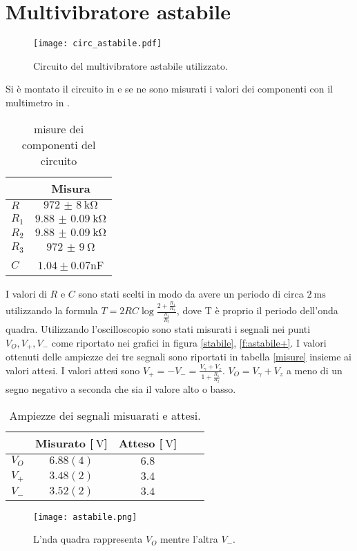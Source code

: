 \section{Multivibratore astabile}
\begin{figure}[h]
	\centering
	\texttt{[image: circ\_astabile.pdf]}
	\caption{Circuito del multivibratore astabile utilizzato.}
	\label{f:multi_vibr}
\end{figure}
Si è montato il circuito in  e se ne sono misurati i valori dei componenti con il multimetro in .
\begin{table}
	\centering
	\begin{tabular}{lc} 
 	&Misura\\ \hline
 	$R$	&$\SI{972(8)}{\kohm}$\\
	 $R_1$	&$\SI{9.88(9)}{\kohm}$\\
	 $R_2$	&$\SI{9.88(9)}{\kohm}$\\
	 $R_3$	&$\SI{972(9)}{\ohm}$\\
	 $C$	&$1.04 \pm 0.07$nF
	\end{tabular}
	\caption{misure dei componenti del circuito}
	\label{misure_componenti}
\end{table}
I valori di $R$ e $C$ sono stati scelti in modo da avere un periodo di circa $\SI{2}{\ms}$ utilizzando la formula $T=2RC\log\frac{2+\frac{R_1}{R_2}}{\frac{R_1}{R_2}}$, dove T è proprio il periodo dell'onda quadra. Utilizzando l'oscilloscopio sono stati misurati i segnali nei punti $V_O , V_+ ,V_-$ come riportato nei grafici in figura \ref{stabile}, \ref{f:astabile+}.
I valori ottenuti delle ampiezze dei tre segnali sono riportati in tabella \ref{misure} insieme ai valori attesi.
I valori attesi sono $V_+=-V_-=\frac{V_\gamma +V_z}{1+\frac{R_1}{R_2}}$.  $V_O= V_\gamma +V_z$ a meno di un segno negativo a seconda che sia il valore alto o basso.
\begin{table}[h]
	\centering 
	\begin{tabular}{lcccc}
	&Misurato [$\SI{}{\V}$]&Atteso [$\SI{}{\V}$]\\ \hline\hline
	$V_O$	& $6.88(4)$	& $6.8$\\
	$V_+$	& $3.48(2)$	& $3.4$ \\
	$V_-$	& $3.52(2)$	& $3.4$ \\
	\end{tabular}
	\caption{Ampiezze dei segnali misuarati e attesi.}
	\label{t:misure} 
\end{table}

\begin{figure}[h]
	\centering
	\texttt{[image: astabile.png]}
	\caption{L'nda quadra rappresenta $V_O$ mentre l'altra $V_-$.}
	\label{f:astabile}
\end{figure}

